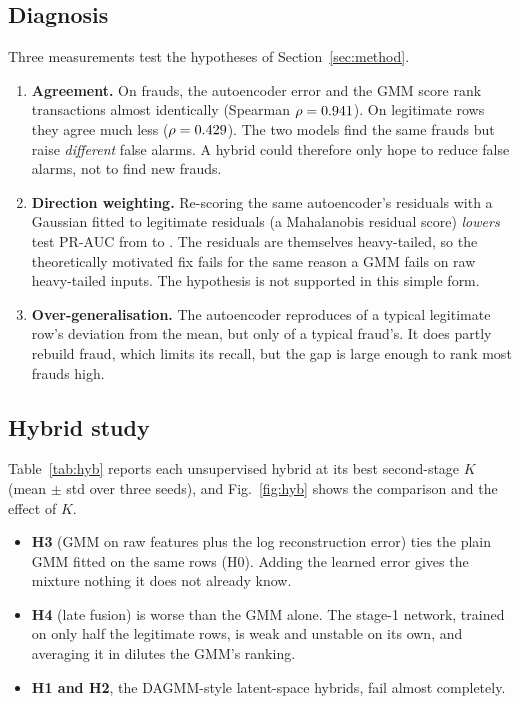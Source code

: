 \documentclass[12pt]{article}
\begin{document}
\subsection{Diagnosis}\label{sec:diag}
Three measurements test the hypotheses of Section~\ref{sec:method}.
\begin{enumerate}
\item \textbf{Agreement.} On frauds, the autoencoder error and the GMM score rank transactions almost identically
(Spearman $\rho=0.941$). On legitimate rows they agree much less ($\rho=0.429$). The two models find the
same frauds but raise \emph{different} false alarms. A hybrid could therefore only hope to reduce false alarms, not to
find new frauds.
\item \textbf{Direction weighting.} Re-scoring the same autoencoder's residuals with a Gaussian fitted to legitimate
residuals (a Mahalanobis residual score) \emph{lowers} test PR-AUC from \diagMSE{} to \diagMaha{}. The residuals are
themselves heavy-tailed, so the theoretically motivated fix fails for the same reason a GMM fails on raw heavy-tailed
inputs. The hypothesis is not supported in this simple form.
\item \textbf{Over-generalisation.} The autoencoder reproduces \diagReconLegit{} of a typical legitimate row's deviation
from the mean, but only \diagReconFraud{} of a typical fraud's. It does partly rebuild fraud, which limits its recall,
but the gap is large enough to rank most frauds high.
\end{enumerate}

\subsection{Hybrid study}
Table~\ref{tab:hyb} reports each unsupervised hybrid at its best second-stage $K$ (mean $\pm$ std over three seeds),
and Fig.~\ref{fig:hyb} shows the comparison and the effect of $K$.
\begin{itemize}
\item \textbf{H3} (GMM on raw features plus the log reconstruction error) ties the plain GMM fitted on the same rows
(H0). Adding the learned error gives the mixture nothing it does not already know.
\item \textbf{H4} (late fusion) is worse than the GMM alone. The stage-1 network, trained on only half the legitimate
rows, is weak and unstable on its own, and averaging it in dilutes the GMM's ranking.
\item \textbf{H1 and H2}, the DAGMM-style latent-space hybrids, fail almost completely.
\end{itemize}
\end{document}
